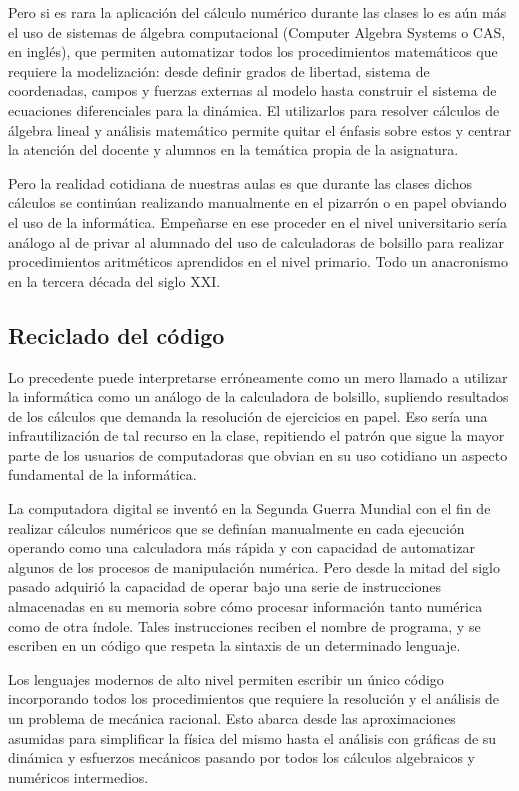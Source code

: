 Pero si es rara la aplicación del cálculo numérico durante las clases lo es aún más el uso de sistemas de álgebra computacional (Computer Algebra Systems o CAS, en inglés), que permiten automatizar todos los procedimientos matemáticos que requiere la modelización: desde definir grados de libertad, sistema de coordenadas, campos y fuerzas externas al modelo hasta construir el sistema de ecuaciones diferenciales para la dinámica. El utilizarlos para resolver cálculos de álgebra lineal y análisis matemático permite quitar el énfasis sobre estos y centrar la atención del docente y alumnos en la temática propia de la asignatura.

Pero la realidad cotidiana de nuestras aulas es que durante las clases dichos cálculos se continúan realizando manualmente en el pizarrón o en papel obviando el uso de la informática. Empeñarse en ese proceder en el nivel universitario sería análogo al de privar al alumnado del uso de calculadoras de bolsillo para realizar procedimientos aritméticos aprendidos en el nivel primario. Todo un anacronismo en la tercera década del siglo XXI.

\subsection{Reciclado del código}

Lo precedente puede interpretarse erróneamente como un mero llamado a utilizar la informática como un análogo de la calculadora de bolsillo, supliendo resultados de los cálculos que demanda la resolución de ejercicios en papel. Eso sería una infrautilización de tal recurso en la clase, repitiendo el patrón que sigue la mayor parte de los usuarios de computadoras que obvian en su uso cotidiano un aspecto fundamental de la informática.

La computadora digital se inventó en la Segunda Guerra Mundial con el fin de realizar cálculos numéricos que se definían manualmente en cada ejecución operando como una calculadora más rápida y con capacidad de automatizar algunos de los procesos de manipulación numérica.  Pero desde la mitad del siglo pasado adquirió la capacidad de operar bajo una serie de instrucciones almacenadas en su memoria sobre cómo procesar información tanto numérica como de otra índole. Tales instrucciones reciben el nombre de programa, y se escriben en un código que respeta la sintaxis de un determinado lenguaje.

Los lenguajes modernos de alto nivel permiten escribir un único código incorporando  todos los procedimientos que requiere la resolución y el análisis de un problema de mecánica racional. Esto abarca desde las aproximaciones asumidas para simplificar la física del mismo hasta el análisis con gráficas de su dinámica y esfuerzos mecánicos pasando por todos los cálculos algebraicos y numéricos intermedios.

